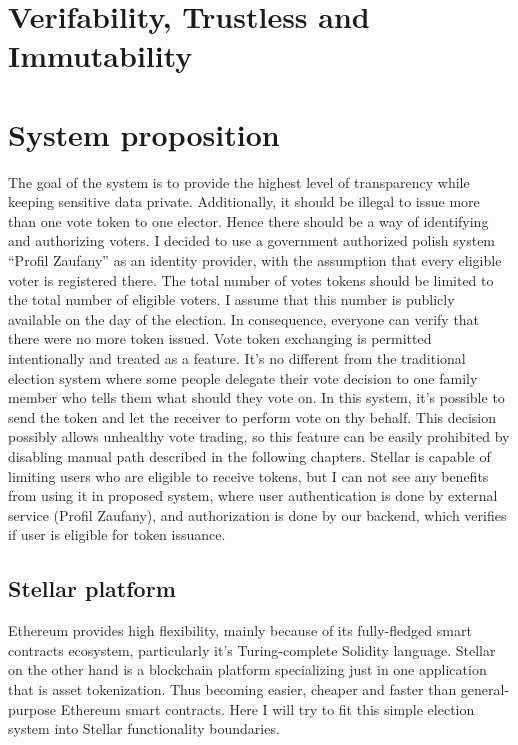 \documentclass[runningheads]{llncs}
\begin{document}


\section{Verifability, Trustless and Immutability}


\section{System proposition}

The goal of the system is to provide the highest level of transparency while keeping sensitive data private. Additionally, it should be illegal to issue more than one vote token to one elector. Hence there should be a way of identifying and authorizing voters. I decided to use a government authorized polish system
“Profil Zaufany” as an identity provider, with the assumption that every eligible voter is registered there. The total number of votes tokens should be limited to the total number of eligible voters. I assume that this number is publicly available on the day of the election. In consequence, everyone can verify that there were no more token issued. Vote token exchanging is permitted intentionally and treated as a feature. It’s no different from the traditional election system where some people delegate their vote decision to one family member who tells them what should they vote on. In this system, it’s possible to send the token and let the receiver to perform vote on thy behalf. This decision possibly allows unhealthy vote trading, so this feature can be easily prohibited by disabling manual path described in the following chapters. Stellar is capable of limiting users who are eligible to receive tokens, but I can not see any benefits from using it in proposed system, where user authentication is done by external service (Profil Zaufany), and authorization is done by our backend, which verifies if user is eligible for token issuance.

\subsection{Stellar platform}
Ethereum provides high flexibility, mainly because of its fully-fledged smart contracts ecosystem, particularly it’s Turing-complete Solidity language. Stellar on the other hand is a blockchain platform specializing just in one application that is asset tokenization. Thus becoming easier, cheaper and faster than general-purpose Ethereum smart contracts. Here I will try to fit this simple election system into Stellar functionality boundaries.
\end{document}
